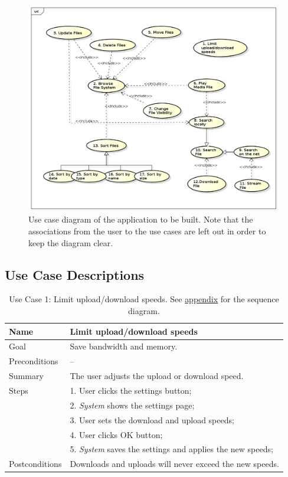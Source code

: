\begin{center}
\begin{figure}[h]
	\centering
	\mbox{\includegraphics[width=1.2\textwidth]{Images/use_case.png}}
	\caption{Use case diagram of the application to be built.
	Note that the associations from the user to the use cases are left out in order to keep the diagram clear.}
	\label{fig:ucdiagram}
\end{figure}
\end{center}

\clearpage
\subsection{Use Case Descriptions}
\label{sec:use_case_descriptions}

\begin{table}[h!]
\centering
\begin{tabular}{|l|l|}
\hline
Name & Limit upload/download speeds\\ \hline
Goal & Save bandwidth and memory.\\ \hline
Preconditions & -- \\ \hline
Summary & The user adjusts the upload or download speed.\\ \hline
Steps &  1. User clicks the settings button; \\
      &  2. \textit{System} shows the settings page; \\
      &  3. User sets the download and upload speeds; \\
      &  4. User clicks OK button; \\
      &  5. \textit{System} saves the settings and applies the new speeds;
        \\ \hline
Postconditions & Downloads and uploads will never exceed the new speeds.
\\ \hline
\end{tabular}
\caption{Use Case 1: Limit upload/download speeds. See \hyperref[fig:req_seq1]{appendix} for the sequence diagram.}
\label{tab:UC1}
\end{table}

